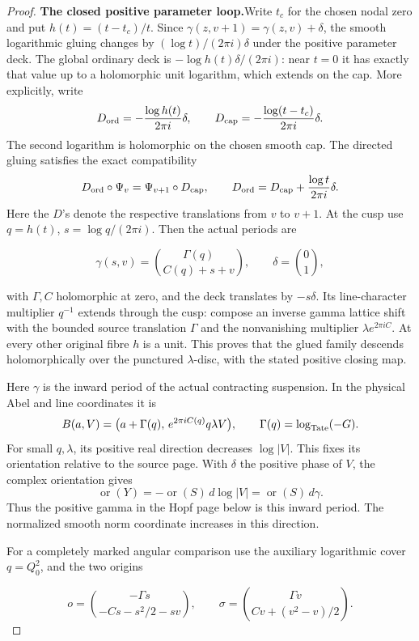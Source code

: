 \begin{proof}
\par\medskip\noindent\textbf{The closed positive parameter loop.}\enspace Write \(t_c\) for
the chosen nodal zero and put
\(h(t)=(t-t_c)/t\).  Since
\(\gamma(z,v+1)=\gamma(z,v)+\delta\), the smooth logarithmic
gluing changes by \((\log t)/(2\pi i)\delta\) under the
positive parameter deck.  The global ordinary deck is
\(-\log h(t)\delta/(2\pi i)\): near \(t=0\) it has exactly
that value up to a holomorphic unit logarithm, which extends on
the cap. More explicitly, write
\[
 D_{\rm ord}=-\frac{\log h(t)}{2\pi i}\delta,\qquad
 D_{\rm cap}=-\frac{\log(t-t_c)}{2\pi i}\delta.
\]
The second logarithm is holomorphic on the chosen smooth cap.
The directed gluing satisfies the exact compatibility
\[
 D_{\rm ord}\circ\Psi_v=\Psi_{v+1}\circ D_{\rm cap},
 \qquad
 D_{\rm ord}=D_{\rm cap}+\frac{\log t}{2\pi i}\delta .
\]
Here the \(D\)'s denote the respective translations from \(v\)
to \(v+1\). At the cusp use \(q=h(t)\), \(s=\log q/(2\pi i)\).
Then the actual periods are

\[
 \gamma(s,v)=\binom{\Gamma(q)}{C(q)+s+v},\qquad
 \delta=\binom01,
\]

with \(\Gamma,C\) holomorphic at zero, and the deck translates
by \(-s\delta\).  Its line-character multiplier \(q^{-1}\)
extends through the cusp: compose an inverse gamma lattice shift
with the bounded source translation \(\Gamma\) and the
nonvanishing multiplier \(\lambda e^{2\pi iC}\).  At every
other original fibre \(h\) is a unit.  This proves that the
glued family descends holomorphically over the punctured
\(\lambda\)-disc, with the stated positive closing map.

Here \(\gamma\) is the inward period of the actual contracting
suspension. In the physical Abel and line coordinates it is
\[
 B(a,V)=
 \bigl(a+\Gamma(q),\,e^{2\pi iC(q)}q\lambda V\bigr),
 \qquad \Gamma(q)=\log_{\rm Tate}(-G).
\]
For small \(q,\lambda\), its positive real direction decreases
\(\log|V|\). This fixes its orientation relative to the source
page. With \(\delta\) the positive phase of \(V\), the complex
orientation gives
\[
 \operatorname{or}(Y)
   =-\operatorname{or}(S)\,d\log|V|
   =\operatorname{or}(S)\,d\gamma .
\]
Thus the positive gamma in the Hopf page below is this inward
period. The normalized smooth norm coordinate increases in
this direction.

For a completely marked angular comparison use the auxiliary
logarithmic cover \(q=Q_0^2\), and the two origins

\[
 o=\binom{-\Gamma s}{-Cs-s^2/2-sv},\qquad
 \sigma=\binom{\Gamma v}{Cv+(v^2-v)/2}.
\]


\end{proof}
